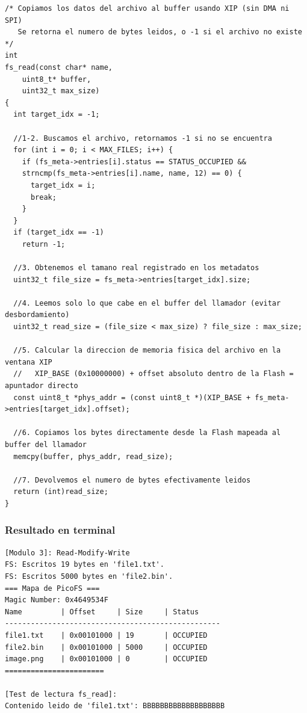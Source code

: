 \documentclass[12pt,letterpaper]{article}
\begin{document}
\begin{lstlisting}[style=modernc, caption={Módulo 3B: lectura directa por ventana XIP (Execute-In-Place)}]
/* Copiamos los datos del archivo al buffer usando XIP (sin DMA ni SPI)
   Se retorna el numero de bytes leidos, o -1 si el archivo no existe */
int
fs_read(const char* name,
	uint8_t* buffer,
	uint32_t max_size)
{
  int target_idx = -1;
  
  //1-2. Buscamos el archivo, retornamos -1 si no se encuentra
  for (int i = 0; i < MAX_FILES; i++) {
    if (fs_meta->entries[i].status == STATUS_OCCUPIED &&
	strncmp(fs_meta->entries[i].name, name, 12) == 0) {
      target_idx = i;
      break;
    }
  }
  if (target_idx == -1)
    return -1;

  //3. Obtenemos el tamano real registrado en los metadatos
  uint32_t file_size = fs_meta->entries[target_idx].size;
  
  //4. Leemos solo lo que cabe en el buffer del llamador (evitar desbordamiento)
  uint32_t read_size = (file_size < max_size) ? file_size : max_size;
  
  //5. Calcular la direccion de memoria fisica del archivo en la ventana XIP
  //   XIP_BASE (0x10000000) + offset absoluto dentro de la Flash = apuntador directo
  const uint8_t *phys_addr = (const uint8_t *)(XIP_BASE + fs_meta->entries[target_idx].offset);
  
  //6. Copiamos los bytes directamente desde la Flash mapeada al buffer del llamador
  memcpy(buffer, phys_addr, read_size);
  
  //7. Devolvemos el numero de bytes efectivamente leidos
  return (int)read_size;
}
\end{lstlisting}

\bigskip

\subsubsection*{Resultado en terminal}

\begin{Verbatim}[frame=single, fontsize=\footnotesize]
[Modulo 3]: Read-Modify-Write
FS: Escritos 19 bytes en 'file1.txt'.
FS: Escritos 5000 bytes en 'file2.bin'.
=== Mapa de PicoFS ===
Magic Number: 0x4649534F
Name         | Offset     | Size     | Status
--------------------------------------------------
file1.txt    | 0x00101000 | 19       | OCCUPIED
file2.bin    | 0x00101000 | 5000     | OCCUPIED
image.png    | 0x00101000 | 0        | OCCUPIED
=======================

[Test de lectura fs_read]:
Contenido leido de 'file1.txt': BBBBBBBBBBBBBBBBBBB
\end{Verbatim}
\end{document}
